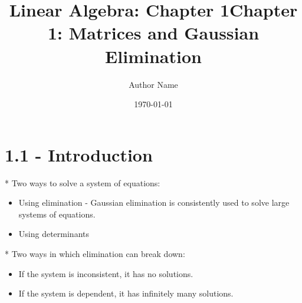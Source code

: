 \documentclass[12pt]{article}
\title{Linear Algebra: Chapter 1}
\author{Author Name}
\date{\today}
\begin{document}
\maketitle

\title{Chapter 1: Matrices and Gaussian Elimination}

\section{1.1 - Introduction}
* Two ways to solve a system of equations:
\begin{itemize}
    \item Using elimination - Gaussian elimination is consistently used to solve large systems of equations.
    \item Using determinants
\end{itemize}
* Two ways in which elimination can break down:
\begin{itemize}
    \item If the system is inconsistent, it has no solutions.
    \item If the system is dependent, it has infinitely many solutions.
\end{itemize}



\end{document}
